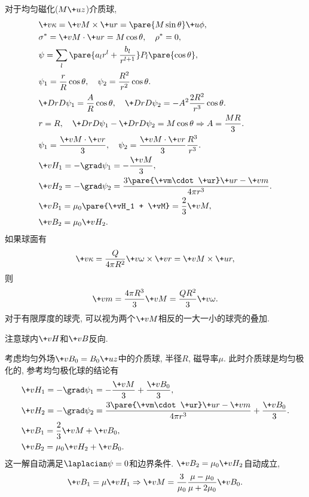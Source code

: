 \documentclass[hidelinks]{ctexart}
\begin{document}
\begin{sample}
    \begin{ex}
        对于均匀磁化($M\+uz$)介质球,
        \begin{align*}
            & \+v\kappa = \+vM \times \+ur = \pare{M\sin\theta}\+u\phi, \\
            & \sigma^* = \+vM\cdot \+ur = M\cos\theta,\quad \rho^* = 0, \\
            & \psi = \sum_l \pare{a_lr^l + \frac{b_l}{r^{l+1}}}P_l\pare{\cos\theta}, \\
            & \psi_1 = \frac{r}{R}\cos\theta,\quad \psi_2 = \frac{R^2}{r^2}\cos\theta. \\
            & \+DrD{\psi_1} = \frac{A}{R}\cos\theta,\quad \+DrD{\psi_2} = -A^2 \frac{2R^2}{r^3}\cos\theta. \\
            & r=R,\quad \+DrD{\psi_1} - \+DrD{\psi_2} = M\cos\theta \Rightarrow A = \frac{MR}{3}. \\
            & \psi_1 = \frac{\+vM\cdot \+vr}{3},\quad \psi_2 = \frac{\+vM\cdot \+vr}{3}\frac{R^3}{r^3}. \\
            & \+vH_1 = -\grad \psi_1 = -\frac{\+vM}{3}, \\
            & \+vH_2 = -\grad \psi_2 = \frac{3\pare{\+vm\cdot \+ur}\+ur - \+vm}{4\pi r^3}. \\
            & \+vB_1 = \mu_0 \pare{\+vH_1 + \+vM} = \frac{2}{3} \+vM, \\
            & \+vB_2 = \mu_0 \+vH_2.
        \end{align*}
        如果球面有
        \[ \+v\kappa = \frac{Q}{4\pi R^2} \+v\omega \times \+vr = \+vM\times \+ur, \]
        则
        \[ \+vm = \frac{4\pi R^3}{3}\+vM = \frac{QR^2}{3}\+v\omega. \]
        对于有限厚度的球壳, 可以视为两个$\+vM$相反的一大一小的球壳的叠加.
    \end{ex}
\end{sample}
\begin{remark}
    注意球内$\+vH$和$\+vB$反向.
\end{remark}
\begin{sample}
    \begin{ex}
        考虑均匀外场$\+vB_0 = B_0 \+uz$中的介质球, 半径$R$, 磁导率$\mu$. 此时介质球是均匀极化的, 参考均匀极化球的结论有
        \begin{align*}
            & \+vH_1 = -\grad \psi_1 = -\frac{\+vM}{3} + \frac{\+vB_0}{3}, \\
            & \+vH_2 = -\grad \psi_2 = \frac{3\pare{\+vm\cdot \+ur}\+ur - \+vm}{4\pi r^3} + \frac{\+vB_0}{3}. \\
            & \+vB_1 = \frac{2}{3} \+vM + \+vB_0, \\
            & \+vB_2 = \mu_0 \+vH_2 + \+vB_0.
        \end{align*}
        这一解自动满足$\laplacian \psi=0$和边界条件. $\+vB_2 = \mu_0 \+vH_2$自动成立,
        \[ \+vB_1 = \mu \+vH_1 \Rightarrow \+vM = \frac{3}{\mu_0}\frac{\mu - \mu_0}{\mu + 2\mu_0} \+vB_0. \]
    \end{ex}
\end{sample}
\end{document}
